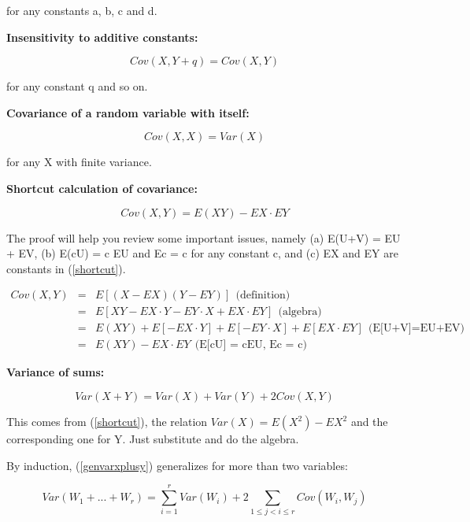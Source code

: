 for any constants a, b, c and d.  

{\bf Insensitivity to additive constants:}

\begin{equation}
\label{covq}
Cov(X,Y+q) = Cov(X,Y)
\end{equation}

for any constant q and so on.

{\bf Covariance of a random variable with itself:}

\begin{equation}
\label{selfcov}
Cov(X,X) = Var(X)
\end{equation}

for any X with finite variance.

{\bf Shortcut calculation of covariance:}

\begin{equation}
\label{shortcut}
Cov(X,Y) = E(XY) - EX \cdot EY
\end{equation}

The proof will help you review some important issues, namely (a) E(U+V)
= EU + EV, (b) E(cU) = c EU and Ec = c for any constant c, and (c) EX
and EY are constants in (\ref{shortcut}).

\begin{eqnarray}
Cov(X,Y) &=& E[(X-EX) (Y-EY) ] ~~ \textrm{(definition)}\\
&=& E \left [ XY - EX \cdot Y - EY \cdot X + EX \cdot EY \right ] ~~
\textrm{(algebra)} \\ 
&=& E(XY) + E[- EX \cdot Y] + E[- EY \cdot X] + E[EX \cdot EY ] ~~
\textrm{(E[U+V]=EU+EV)} \\ 
&=& E(XY) - EX \cdot EY ~~ \textrm{(E[cU] = cEU, Ec = c)}
\end{eqnarray}

{\bf Variance of sums:}

\begin{equation}
\label{genvarxplusy}
Var(X+Y) = Var(X) + Var(Y) + 2 Cov(X,Y)
\end{equation}

This comes from (\ref{shortcut}), the relation $Var(X) = E(X^2) - EX^2$ 
and the corresponding one for Y.  Just substitute and do the algebra.

By induction, (\ref{genvarxplusy}) generalizes for more than two variables:

\begin{equation}
\label{varmultsum}
Var(W_1+...+W_r) =
\sum_{i=1}^r Var(W_i) +
2 \sum_{1 \leq j < i \leq r} Cov(W_i,W_j)
\end{equation}

